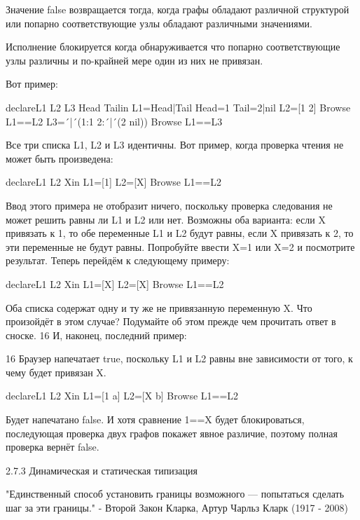 Значение false возвращается тогда, когда графы обладают различной структурой или попарно соответствующие узлы обладают различными значениями.

Исполнение блокируется когда обнаруживается что попарно соответствующие узлы различны и по-крайней мере один из них не привязан.

Вот пример:

declareL1 L2 L3 Head Tailin
L1=Head|Tail
Head=1
Tail=2|nil
L2=[1 2]
{Browse L1==L2}
L3=´|´(1:1 2:´|´(2 nil))
{Browse L1==L3}

Все три списка L1, L2 и L3 идентичны. Вот пример, когда проверка чтения не может быть произведена:

declareL1 L2 Xin
L1=[1]
L2=[X]
{Browse L1==L2}

Ввод этого примера не отобразит ничего, поскольку проверка следования не может решить равны ли L1 и L2 или нет. Возможны оба варианта: если X привязать к 1, то обе переменные L1 и L2 будут равны, если X привязать к 2, то эти переменные не будут равны. Попробуйте ввести X=1 или X=2 и посмотрите результат. Теперь перейдём к следующему примеру:

declareL1 L2 Xin
L1=[X]
L2=[X]
{Browse L1==L2}

Оба списка содержат одну и ту же не привязанную переменную X. Что произойдёт в этом случае? Подумайте об этом прежде чем прочитать ответ в сноске. 16 И, наконец, последний пример:

16 Браузер напечатает true, поскольку L1 и L2 равны вне зависимости от того, к чему будет привязан X.

declareL1 L2 Xin
L1=[1 a]
L2=[X b]
{Browse L1==L2}

Будет напечатано false. И хотя сравнение 1==X будет блокироваться, последующая проверка двух графов покажет явное различие, поэтому полная проверка вернёт false.

2.7.3 Динамическая и статическая типизация

"Единственный способ установить границы возможного — попытаться сделать шаг за эти границы."
- Второй Закон Кларка, Артур Чарльз Кларк (1917 - 2008)

